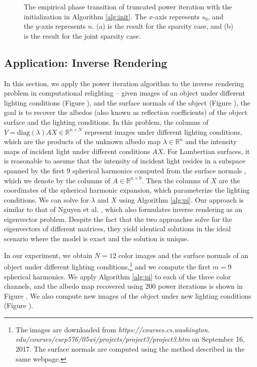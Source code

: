 \documentclass[11pt,journal]{IEEEtran}
\newcommand{\bbR}{\mathbb{R}}
\newcommand{\diag}{\mathrm{diag}}
\begin{document}
\begin{figure}[htbp]%
\centering
\subfloat[]{
\label{fig:tpi_pt_init_s}}
\subfloat[]{
\label{fig:tpi_pt_init_js}}
\caption{The empirical phase transition of truncated power iteration with the initialization in Algorithm \ref{alg:init}. The $x$-axis represents $s_0$, and the $y$-axis represents $n$. (a) is the result for the sparsity case, and (b) is the result for the joint sparsity case.}%
\label{fig:pt_init}%
\end{figure}


\subsection{Application: Inverse Rendering} \label{sec:inverse_render}

In this section, we apply the power iteration algorithm to the inverse rendering problem in computational relighting -- given images of an object under different lighting conditions (Figure ), and the surface normals of the object (Figure ), the goal is to recover the albedos (also known as reflection coefficients) of the object surface and the lighting conditions. In this problem, the columns of $Y=\diag(\lambda)AX \in \bbR^{n\times N}$ represent images under different lighting conditions, which are the products of the unknown albedo map $\lambda \in\bbR^n$ and the intensity maps of incident light under different conditions $AX$. For Lambertian surfaces, it is reasonable to assume that the intensity of incident light resides in a subspace spanned by the first $9$ spherical harmonics computed from the surface normals \cite{Nguyen2013}, which we denote by the columns of $A \in \bbR^{n\times 9}$. Then the columns of $X$ are the coordinates of the spherical harmonic expansion, which parameterize the lighting conditions. 
We can solve for $\lambda$ and $X$ using Algorithm \ref{alg:pi}. Our approach is similar to that of Nguyen et al. \cite{Nguyen2013}, which also formulates inverse rendering as an eigenvector problem. Despite the fact that the two approaches solve for the eigenvectors of different matrices, they yield identical solutions in the ideal scenario where the model is exact and the solution is unique.

In our experiment, we obtain $N=12$ color images and the surface normals of an object under different lighting conditions,\footnote{The images are downloaded from \emph{https://courses.cs.washington. edu/courses/csep576/05wi/projects/project3/project3.htm} on September 16, 2017. The surface normals are computed using the method described in the same webpage.} and we compute the first $m=9$ spherical harmonics. We apply Algorithm \ref{alg:pi} to each of the three color channels, and the albedo map recovered using 200 power iterations is shown in Figure . We also compute new images of the object under new lighting conditions (Figure ).
\end{document}
